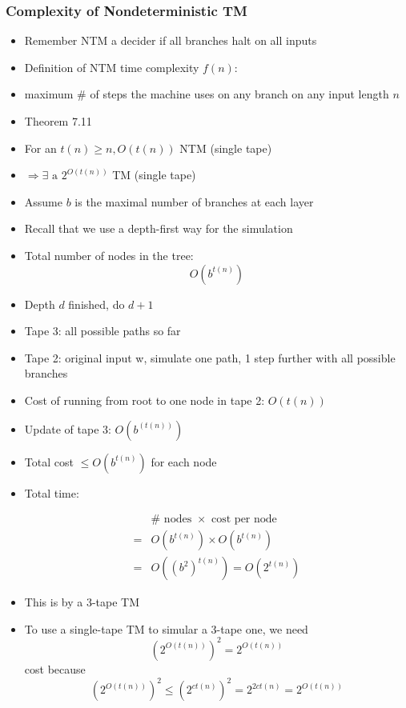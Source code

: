 \begin{frame}[allowframebreaks] \frametitle{Complexity of Nondeterministic TM}
  \begin{itemize}
\item Remember NTM a decider if all branches halt on all inputs

\item Definition of NTM time complexity $f(n)$:

\item [] maximum \# of steps the machine uses on any branch
on any input length $n$

\item Theorem 7.11
\item [] For an $t(n) \geq n, O(t(n))$ NTM (single tape)

\item [] $\Rightarrow \exists \text{ a } 2^{O(t(n))}$ TM (single tape)
\item Assume $b$ is the maximal number of branches at each layer
\item Recall that we use a depth-first way for the simulation
\item Total number of nodes in the tree:
  \begin{equation*}
  O(b^{t(n)})
\end{equation*}
\item Depth $d$ finished, do $d+1$

\item Tape 3: all possible paths so far

\item Tape 2: original input w, simulate one path, 1 step further
with all possible branches


\item Cost of running from root to one node in tape 2: $O(t(n))$

\item Update of tape 3: $O(b^{(t(n))})$

\item Total cost $\leq O(b^{t(n)})$ for each node
\item Total time:

  \begin{equation*}
    \begin{split}
& \# \text{ nodes } \times \text{ cost per node}\\      
= &   O(b^{t(n)}) \times O(b^{t(n)}) \\
= & O((b^2)^{t(n)} ) = O(2^{t(n)})
\end{split}
\end{equation*}

\item This is by a 3-tape TM
\item To use a single-tape TM to simular a 3-tape one, we need
  \begin{equation*}
(2^{O(t(n))})^2
= 2^{O(t(n))}
\end{equation*}
cost because
\begin{equation*}
  (2^{O(t(n))})^2
\leq (2^{ct(n)})^2
= 2^{2ct(n)} 
= 2^{O(t(n))}
\end{equation*}
\end{itemize}\end{frame}



